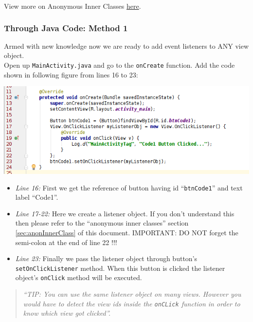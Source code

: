 View more on Anonymous Inner Classes \href{https://docs.oracle.com/javase/tutorial/java/javaOO/anonymousclasses.html}{here}.

\subsubsection{Through Java Code: Method 1}
Armed with new knowledge now we are ready to add event listeners to ANY view object. \\

Open up \texttt{MainActivity.java} and go to the \texttt{onCreate} function. Add the code shown in following figure from lines 16 to 23: 

\begin{center}
	\includegraphics[scale=0.4]{chapters/ch05/images/7}
\end{center}

\begin{itemize}
	\item \textit{Line 16:} First we get the reference of button having id ``\texttt{btnCode1}'' and text label ``Code1''.
	\item \textit{Line 17-22:} Here we create a listener object. If you don't understand this then please refer to the ``anonymous inner classes'' section \ref{sec:anonInnerClass} of this document. IMPORTANT: DO NOT forget the semi-colon at the end of line 22 !!!
	\item \textit{Line 23:} Finally we pass the listener object through button's \texttt{setOnClickListener} method. When this button is clicked the listener object's \texttt{onClick} method will be executed.
\end{itemize}

\begin{quote}
	\textit{``TIP: You can use the same listener object on many views. However you would have to detect the view ids inside the \texttt{onCLick} function in order to know which view got clicked''.}
\end{quote}

